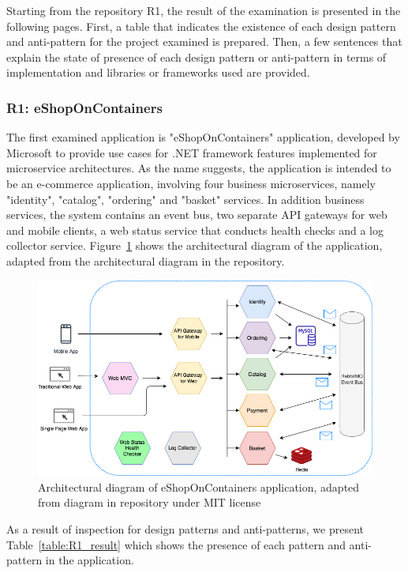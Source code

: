 \documentclass{Configuration_Files/PoliMi3i_thesis}
\begin{document}
Starting from the repository R1, the result of the examination is presented in the following pages.
First, a table that indicates the existence of each design pattern and anti-pattern for the project examined is prepared.
Then, a few sentences that explain the state of presence of each design pattern or anti-pattern in terms of implementation and libraries or frameworks used are provided. 

\subsubsection{R1: eShopOnContainers}
\label{subsubsec:R1}

The first examined application is "eShopOnContainers" application, developed by Microsoft to provide use cases for .NET framework features implemented for microservice architectures.
As the name suggests, the application is intended to be an e-commerce application, involving four business microservices, namely "identity", "catalog", "ordering" and "basket" services.
In addition business services, the system contains an event bus, two separate API gateways for web and mobile clients, a web status service that conducts health checks and a log collector service.
Figure~\ref{fig:R1_arch} shows the architectural diagram of the application, adapted from the architectural diagram in the repository.

\begin{figure}[H]
\centering
\includegraphics[width=1\textwidth]{myImages/R1.png}
\caption{Architectural diagram of eShopOnContainers application, adapted from diagram in repository under MIT license}
\label{fig:R1_arch}
\end{figure}

As a result of inspection for design patterns and anti-patterns, we present Table~\ref{table:R1_result} which shows the presence of each pattern and anti-pattern in the application.
\end{document}
